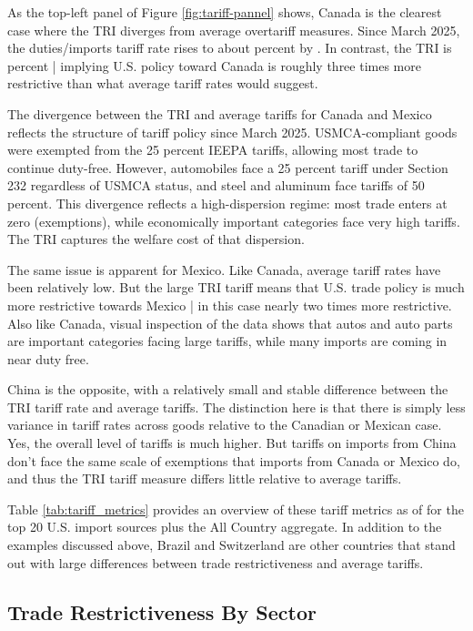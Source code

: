 \documentclass[12pt,pdftex]{article}
\begin{document}
\begin{onehalfspacing}
As the top-left panel of Figure \ref{fig:tariff-pannel} shows, Canada is the clearest case where the TRI diverges from average overtariff measures. Since March 2025, the duties/imports tariff rate rises to about \canadasimpleMeanValuetwofive{} percent by \currentdate{}. In contrast, the TRI is \canadarmsValuetwofive{} percent | implying U.S. policy toward Canada is roughly three times more restrictive than what average tariff rates would suggest.

The divergence between the TRI and average tariffs for Canada and Mexico reflects the structure of tariff policy since March 2025. USMCA-compliant goods were exempted from the 25 percent IEEPA tariffs, allowing most trade to continue duty-free. However, automobiles face a 25 percent tariff under Section 232 regardless of USMCA status, and steel and aluminum face tariffs of 50 percent. This divergence reflects a high-dispersion regime: most trade enters at zero (exemptions), while economically important categories face very high tariffs. The TRI captures the welfare cost of that dispersion.

The same issue is apparent for Mexico. Like Canada, average tariff rates have been relatively low. But the large TRI tariff means that U.S. trade policy is much more restrictive towards Mexico | in this case nearly two times more restrictive. Also like Canada, visual inspection of the data shows that autos and auto parts are important categories facing large tariffs, while many imports are coming in near duty free.

China is the opposite, with a relatively small and stable difference between the TRI tariff rate and average tariffs. The distinction here is that there is simply less variance in tariff rates across goods relative to the Canadian or Mexican case.  Yes, the overall level of tariffs is much higher. But tariffs on imports from China don't face the same scale of exemptions that imports from Canada or Mexico do, and thus the TRI tariff measure differs little relative to average tariffs.

Table \ref{tab:tariff_metrics} provides an overview of these tariff metrics as of \currentdate{} for the top 20 U.S. import sources plus the All Country aggregate. In addition to the examples discussed above, Brazil and Switzerland are other countries that stand out with large differences between trade restrictiveness and average tariffs.

\subsection{Trade Restrictiveness By Sector}\label{sec:results3}


\end{onehalfspacing}
\end{document}
